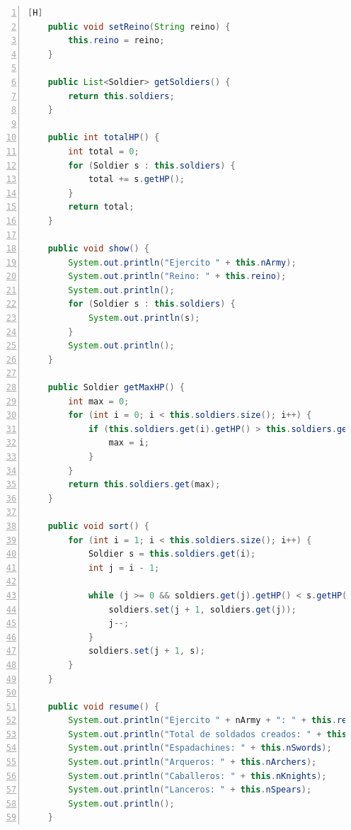 \documentclass{article}
\begin{document}
\begin{lstlisting}[language=java,caption={Clase Army}, numbers=left][H]
    public void setReino(String reino) {
        this.reino = reino;
    }

    public List<Soldier> getSoldiers() {
        return this.soldiers;
    }

    public int totalHP() {
        int total = 0;
        for (Soldier s : this.soldiers) {
            total += s.getHP();
        }
        return total;
    }

    public void show() {
        System.out.println("Ejercito " + this.nArmy);
        System.out.println("Reino: " + this.reino);
        System.out.println();
        for (Soldier s : this.soldiers) {
            System.out.println(s);
        }
        System.out.println();
    }

    public Soldier getMaxHP() {
        int max = 0;
        for (int i = 0; i < this.soldiers.size(); i++) {
            if (this.soldiers.get(i).getHP() > this.soldiers.get(max).getHP()) {
                max = i;
            }
        }
        return this.soldiers.get(max);
    }

    public void sort() {
        for (int i = 1; i < this.soldiers.size(); i++) {
            Soldier s = this.soldiers.get(i);
            int j = i - 1;

            while (j >= 0 && soldiers.get(j).getHP() < s.getHP()) {
                soldiers.set(j + 1, soldiers.get(j));
                j--;
            }
            soldiers.set(j + 1, s);
        }
    }

    public void resume() {
        System.out.println("Ejercito " + nArmy + ": " + this.reino);
        System.out.println("Total de soldados creados: " + this.soldiers.size());
        System.out.println("Espadachines: " + this.nSwords);
        System.out.println("Arqueros: " + this.nArchers);
        System.out.println("Caballeros: " + this.nKnights);
        System.out.println("Lanceros: " + this.nSpears);
        System.out.println();
    }
	\end{lstlisting}
\end{document}
